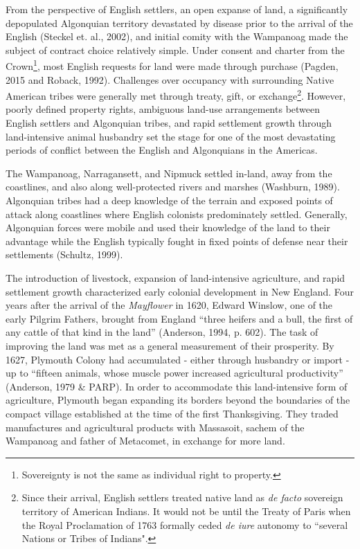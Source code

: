 \documentclass[11pt]{article}
\begin{document}
From the perspective of English settlers, an open expanse of land, a significantly depopulated Algonquian territory devastated by disease prior to the arrival of the English (Steckel et. al., 2002), and initial comity with the Wampanoag made the subject of contract choice relatively simple. Under consent and charter from the Crown\footnote{Sovereignty is not the same as individual right to property.}, most English requests for land were made through purchase (Pagden, 2015 and Roback, 1992). Challenges over occupancy with surrounding Native American tribes were generally met through treaty, gift, or exchange\footnote{Since their arrival, English settlers treated native land as {\em de facto} sovereign territory of American Indians. It would not be until the Treaty of Paris when the Royal Proclamation of 1763 formally ceded {\em de iure} autonomy to ``several Nations or Tribes of Indians".}. However, poorly defined property rights, ambiguous land-use arrangements between English settlers and Algonquian tribes, and rapid settlement growth through land-intensive animal husbandry set the stage for one of the most devastating periods of conflict between the English and Algonquians in the Americas.

The Wampanoag, Narragansett, and Nipmuck settled in-land, away from the coastlines, and also along well-protected rivers and marshes (Washburn, 1989). Algonquian tribes had a deep knowledge of the terrain and exposed points of attack along coastlines where English colonists predominately settled. Generally, Algonquian forces were mobile and used their knowledge of the land to their advantage while the English typically fought in fixed points of defense near their settlements (Schultz, 1999). 

The introduction of livestock, expansion of land-intensive agriculture, and rapid settlement growth characterized early colonial development in New England. Four years after the arrival of the {\em Mayflower} in 1620, Edward Winslow, one of the early Pilgrim Fathers, brought from England ``three heifers and a bull, the first of any cattle of that kind in the land'' (Anderson, 1994, p. 602). The task of improving the land was met as a general measurement of their prosperity. By 1627, Plymouth Colony had accumulated - either through husbandry or import - up to ``fifteen animals, whose muscle power increased agricultural productivity'' (Anderson, 1979 \& PARP). In order to accommodate this land-intensive form of agriculture, Plymouth began expanding its borders beyond the boundaries of the compact village established at the time of the first Thanksgiving. They traded manufactures and agricultural products with Massasoit, sachem of the Wampanoag and father of Metacomet, in exchange for more land.
\end{document}
